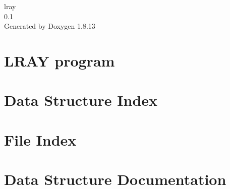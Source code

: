 \documentclass[twoside]{book}
\newcommand{\+}{\discretionary{\mbox{\scriptsize$\hookleftarrow$}}{}{}}
\newcommand{\clearemptydoublepage}{%
  \newpage{\pagestyle{empty}\cleardoublepage}%
}
\begin{document}
\hypersetup{pageanchor=false,
             bookmarksnumbered=true,
             pdfencoding=unicode
            }
\begin{titlepage}
\vspace*{7cm}
\begin{center}%
{\Large lray \\[1ex]\large 0.\+1 }\\
\vspace*{1cm}
{\large Generated by Doxygen 1.8.13}\\
\end{center}
\end{titlepage}
\clearemptydoublepage
{}
\tableofcontents
\clearemptydoublepage
{}
\hypersetup{pageanchor=true}

\chapter{L\+R\+AY program}
\label{md_readme}

\chapter{Data Structure Index}

\chapter{File Index}

\chapter{Data Structure Documentation}




































\end{document}
